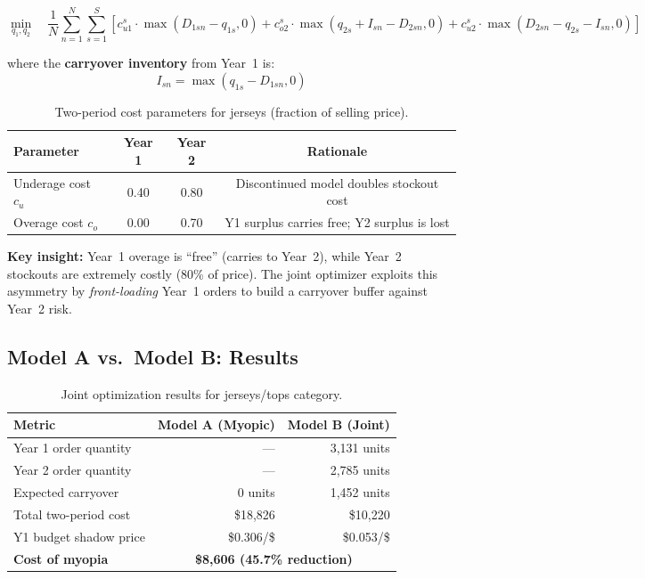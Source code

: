 \documentclass[11pt, letterpaper]{article}
\begin{document}
\begin{equation}
\min_{q_1, q_2} \quad \frac{1}{N} \sum_{n=1}^{N} \sum_{s=1}^{S} \left[
c_{u1}^s \cdot \max(D_{1sn} - q_{1s}, 0)
+ c_{o2}^s \cdot \max(q_{2s} + I_{sn} - D_{2sn}, 0)
+ c_{u2}^s \cdot \max(D_{2sn} - q_{2s} - I_{sn}, 0)
\right]
\label{eq:model-b}
\end{equation}

where the \textbf{carryover inventory} from Year~1 is:
\[
I_{sn} = \max(q_{1s} - D_{1sn}, 0)
\]

\begin{table}[H]
\centering
\caption{Two-period cost parameters for jerseys (fraction of selling price).}
\label{tab:two-period-costs}
\begin{tabular}{@{}lccc@{}}
\toprule
\textbf{Parameter} & \textbf{Year 1} & \textbf{Year 2} & \textbf{Rationale} \\
\midrule
Underage cost $c_u$ & 0.40 & 0.80 & Discontinued model doubles stockout cost \\
Overage cost $c_o$ & 0.00 & 0.70 & Y1 surplus carries free; Y2 surplus is lost \\
\bottomrule
\end{tabular}
\end{table}

\textbf{Key insight:} Year~1 overage is ``free'' (carries to Year~2), while Year~2 stockouts are extremely costly (80\% of price). The joint optimizer exploits this asymmetry by \emph{front-loading} Year~1 orders to build a carryover buffer against Year~2 risk.

\subsection{Model A vs.\ Model B: Results}

\begin{table}[H]
\centering
\caption{Joint optimization results for jerseys/tops category.}
\label{tab:joint-results}
\begin{tabular}{@{}lrr@{}}
\toprule
\textbf{Metric} & \textbf{Model A (Myopic)} & \textbf{Model B (Joint)} \\
\midrule
Year 1 order quantity & --- & 3,131 units \\
Year 2 order quantity & --- & 2,785 units \\
Expected carryover & 0 units & 1,452 units \\
Total two-period cost & \$18,826 & \$10,220 \\
Y1 budget shadow price & \$0.306/\$ & \$0.053/\$ \\
\midrule
\textbf{Cost of myopia} & \multicolumn{2}{c}{\textbf{\$8,606 (45.7\% reduction)}} \\
\bottomrule
\end{tabular}
\end{table}
\end{document}
